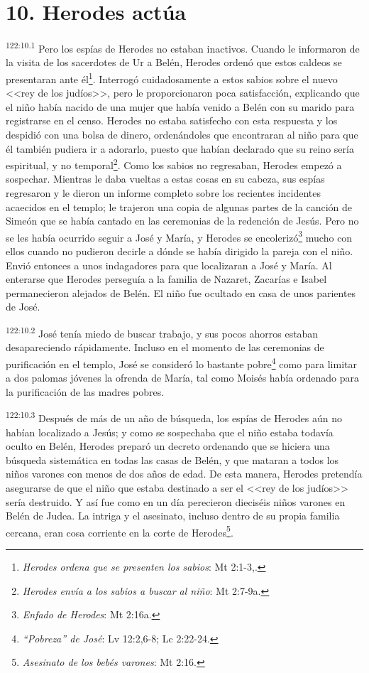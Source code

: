 \section*{10. Herodes actúa}
\par 
\textsuperscript{122:10.1} Pero los espías de Herodes no estaban inactivos. Cuando le informaron de la visita de los sacerdotes de Ur a Belén, Herodes ordenó que estos caldeos se presentaran ante él\footnote{\textit{Herodes ordena que se presenten los sabios}: Mt 2:1-3,.}. Interrogó cuidadosamente a estos sabios sobre el nuevo <<rey de los judíos>>, pero le proporcionaron poca satisfacción, explicando que el niño había nacido de una mujer que había venido a Belén con su marido para registrarse en el censo. Herodes no estaba satisfecho con esta respuesta y los despidió con una bolsa de dinero, ordenándoles que encontraran al niño para que él también pudiera ir a adorarlo, puesto que habían declarado que su reino sería espiritual, y no temporal\footnote{\textit{Herodes envía a los sabios a buscar al niño}: Mt 2:7-9a.}. Como los sabios no regresaban, Herodes empezó a sospechar. Mientras le daba vueltas a estas cosas en su cabeza, sus espías regresaron y le dieron un informe completo sobre los recientes incidentes acaecidos en el templo; le trajeron una copia de algunas partes de la canción de Simeón que se había cantado en las ceremonias de la redención de Jesús. Pero no se les había ocurrido seguir a José y María, y Herodes se encolerizó\footnote{\textit{Enfado de Herodes}: Mt 2:16a.} mucho con ellos cuando no pudieron decirle a dónde se había dirigido la pareja con el niño. Envió entonces a unos indagadores para que localizaran a José y María. Al enterarse que Herodes perseguía a la familia de Nazaret, Zacarías e Isabel permanecieron alejados de Belén. El niño fue ocultado en casa de unos parientes de José.

\par 
\textsuperscript{122:10.2} José tenía miedo de buscar trabajo, y sus pocos ahorros estaban desapareciendo rápidamente. Incluso en el momento de las ceremonias de purificación en el templo, José se consideró lo bastante pobre\footnote{\textit{``Pobreza'' de José}: Lv 12:2,6-8; Lc 2:22-24.} como para limitar a dos palomas jóvenes la ofrenda de María, tal como Moisés había ordenado para la purificación de las madres pobres.

\par 
\textsuperscript{122:10.3} Después de más de un año de búsqueda, los espías de Herodes aún no habían localizado a Jesús; y como se sospechaba que el niño estaba todavía oculto en Belén, Herodes preparó un decreto ordenando que se hiciera una búsqueda sistemática en todas las casas de Belén, y que mataran a todos los niños varones con menos de dos años de edad. De esta manera, Herodes pretendía asegurarse de que el niño que estaba destinado a ser el <<rey de los judíos>> sería destruido. Y así fue como en un día perecieron dieciséis niños varones en Belén de Judea. La intriga y el asesinato, incluso dentro de su propia familia cercana, eran cosa corriente en la corte de Herodes\footnote{\textit{Asesinato de los bebés varones}: Mt 2:16.}.

